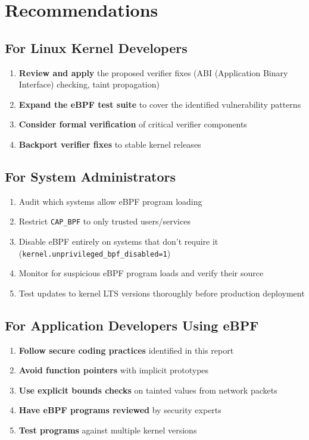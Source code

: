 \section{Recommendations}

\noindent
\subsection{For Linux Kernel Developers}

\begin{enumerate}[label=\arabic*.]
  \item \textbf{Review and apply} the proposed verifier fixes (ABI (Application Binary Interface) checking, taint propagation)
  \item \textbf{Expand the eBPF test suite} to cover the identified vulnerability patterns
  \item \textbf{Consider formal verification} of critical verifier components
  \item \textbf{Backport verifier fixes} to stable kernel releases
\end{enumerate}

\subsection{For System Administrators}

\begin{enumerate}[label=\arabic*.]
  \item Audit which systems allow eBPF program loading
  \item Restrict \texttt{CAP\_BPF} to only trusted users/services
  \item Disable eBPF entirely on systems that don't require it (\texttt{kernel.unprivileged\_bpf\_disabled=1})
  \item Monitor for suspicious eBPF program loads and verify their source
  \item Test updates to kernel LTS versions thoroughly before production deployment
\end{enumerate}

\subsection{For Application Developers Using eBPF}

\begin{enumerate}[label=\arabic*.]
  \item \textbf{Follow secure coding practices} identified in this report
  \item \textbf{Avoid function pointers} with implicit prototypes
  \item \textbf{Use explicit bounds checks} on tainted values from network packets
  \item \textbf{Have eBPF programs reviewed} by security experts
  \item \textbf{Test programs} against multiple kernel versions
\end{enumerate}


